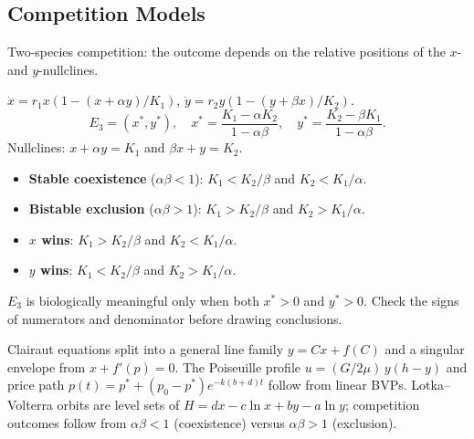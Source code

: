 \subsection{Competition Models}

Two-species competition: the outcome depends on the relative positions of the
$x$- and $y$-nullclines.

\begin{formulabox}
$\dot{x} = r_1 x(1 - (x + \alpha y)/K_1)$,\;
$\dot{y} = r_2 y(1 - (y + \beta x)/K_2)$.
\[
  E_3 = (x^*, y^*), \quad
  x^* = \frac{K_1 - \alpha K_2}{1 - \alpha\beta}, \quad
  y^* = \frac{K_2 - \beta K_1}{1 - \alpha\beta}.
\]
Nullclines: $x + \alpha y = K_1$ and $\beta x + y = K_2$.
\end{formulabox}

\begin{methodbox}
\begin{itemize}[leftmargin=1.4em, itemsep=3pt]
  \item \textbf{Stable coexistence} ($\alpha\beta < 1$):
        $K_1 < K_2/\beta$ and $K_2 < K_1/\alpha$.
  \item \textbf{Bistable exclusion} ($\alpha\beta > 1$):
        $K_1 > K_2/\beta$ and $K_2 > K_1/\alpha$.
  \item \textbf{$x$ wins}: $K_1 > K_2/\beta$ and $K_2 < K_1/\alpha$.
  \item \textbf{$y$ wins}: $K_1 < K_2/\beta$ and $K_2 > K_1/\alpha$.
\end{itemize}
\end{methodbox}

\begin{warningbox}
$E_3$ is biologically meaningful only when both $x^* > 0$ and $y^* > 0$.
Check the signs of numerators and denominator before drawing conclusions.
\end{warningbox}

\vspace{0.6em}

\begin{conceptbox}
Clairaut equations split into a \textcolor{accentorange}{general line family
$y = Cx + f(C)$} and a \textcolor{accentorange}{singular envelope} from
$x + f'(p) = 0$. The Poiseuille profile
\textcolor{accentorange}{$u = (G/2\mu)\,y(h-y)$} and price path
\textcolor{accentorange}{$p(t) = p^* + (p_0 - p^*)e^{-k(b+d)t}$} follow from
linear BVPs. Lotka--Volterra orbits are level sets of
\textcolor{accentorange}{$H = dx - c\ln x + by - a\ln y$}; competition outcomes
follow from \textcolor{accentorange}{$\alpha\beta < 1$} (coexistence) versus
\textcolor{accentorange}{$\alpha\beta > 1$} (exclusion).
\end{conceptbox}

